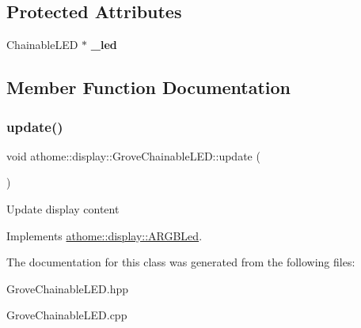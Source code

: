 \subsection*{Protected Attributes}
\begin{DoxyCompactItemize}
\item 
\mbox{\label{classathome_1_1display_1_1_grove_chainable_l_e_d_a4376da3d5ad9f1763aa6b3b45ec7e01a}} 
Chainable\+L\+ED $\ast$ {\bfseries \+\_\+led}
\end{DoxyCompactItemize}


\subsection{Member Function Documentation}
\mbox{\label{classathome_1_1display_1_1_grove_chainable_l_e_d_a05a4a1381396b7fc11a24993865d8226}} 
\subsubsection{\texorpdfstring{update()}{update()}}
{\footnotesize\ttfamily void athome\+::display\+::\+Grove\+Chainable\+L\+E\+D\+::update (\begin{DoxyParamCaption}{ }\end{DoxyParamCaption})\hspace{0.3cm}{\ttfamily [virtual]}}

Update display content 

Implements \mbox{\hyperlink{classathome_1_1display_1_1_a_r_g_b_led_a725ceca0c01735daa9c95148baf075ab}{athome\+::display\+::\+A\+R\+G\+B\+Led}}.



The documentation for this class was generated from the following files\+:\begin{DoxyCompactItemize}
\item 
Grove\+Chainable\+L\+E\+D.\+hpp\item 
Grove\+Chainable\+L\+E\+D.\+cpp\end{DoxyCompactItemize}
